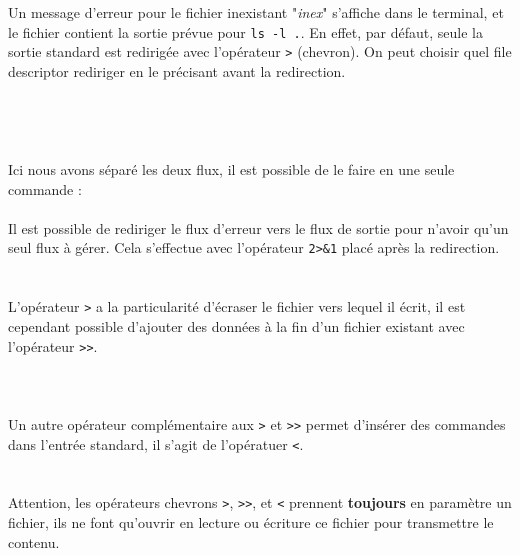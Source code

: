 \\
\\

Un message d'erreur pour le fichier inexistant "\textit{inex}" s'affiche dans le terminal, et le fichier contient la sortie prévue pour \texttt{ls -l .}.
En effet, par défaut, seule la sortie standard est redirigée avec l'opérateur \texttt{>} (chevron).
On peut choisir quel file descriptor rediriger en le précisant avant la redirection.\\

\\
\\
\\
\\

Ici nous avons séparé les deux flux, il est possible de le faire en une seule commande :\\

\\

Il est possible de rediriger le flux d'erreur vers le flux de sortie pour n'avoir qu'un seul flux à gérer.
Cela s'effectue avec l'opérateur \texttt{2>\&1} placé après la redirection.\\

\\
\\

L'opérateur \texttt{>} a la particularité d'écraser le fichier vers lequel il écrit, il est cependant possible d'ajouter des données à la fin d'un fichier existant avec l'opérateur \texttt{>{}>}.\\

\\
\\
\\

Un autre opérateur complémentaire aux \texttt{>} et \texttt{>{}>} permet d'insérer des commandes dans l'entrée standard, il s'agit de l'opératuer \texttt{<}.\\

\\
\\

Attention, les opérateurs chevrons \texttt{>}, \texttt{>{}>}, et \texttt{<} prennent \textbf{toujours} en paramètre un fichier, ils ne font qu'ouvrir en lecture ou écriture ce fichier pour transmettre le contenu.\\

